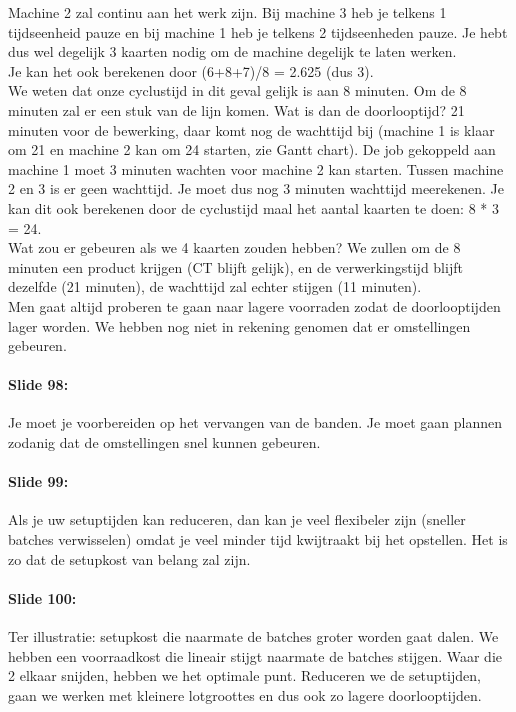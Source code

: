 \documentclass[10pt,a4paper]{report}
\begin{document}
Machine 2 zal continu aan het werk zijn. Bij machine 3 heb je telkens 1 tijdseenheid pauze en bij machine 1 heb je telkens 2 tijdseenheden pauze. Je hebt dus wel degelijk 3 kaarten nodig om de machine degelijk te laten werken.\\
Je kan het ook berekenen door (6+8+7)/8 = 2.625 (dus 3).\\
We weten dat onze cyclustijd in dit geval gelijk is aan 8 minuten. Om de 8 minuten zal er een stuk van de lijn komen. Wat is dan de doorlooptijd? 21 minuten voor de bewerking, daar komt nog de wachttijd bij (machine 1 is klaar om 21 en machine 2 kan om 24 starten, zie Gantt chart). De job gekoppeld aan machine 1 moet 3 minuten wachten voor machine 2 kan starten. Tussen machine 2 en 3 is er geen wachttijd. Je moet dus nog 3 minuten wachttijd meerekenen. Je kan dit ook berekenen door de cyclustijd maal het aantal kaarten te doen: 8 * 3 = 24.\\
Wat zou er gebeuren als we 4 kaarten zouden hebben? We zullen om de 8 minuten een product krijgen (CT blijft gelijk), en de verwerkingstijd blijft dezelfde (21 minuten), de wachttijd zal echter stijgen (11 minuten).\\ 
Men gaat altijd proberen te gaan naar lagere voorraden zodat de doorlooptijden lager worden. 
We hebben nog niet in rekening genomen dat er omstellingen gebeuren.

\paragraph{Slide 98:} Je moet je voorbereiden op het vervangen van de banden. Je moet gaan plannen zodanig dat de omstellingen snel kunnen gebeuren.

\paragraph{Slide 99:} Als je uw setuptijden kan reduceren, dan kan je veel flexibeler zijn (sneller batches verwisselen) omdat je veel minder tijd kwijtraakt bij het opstellen. 
Het is zo dat de setupkost van belang zal zijn. 

\paragraph{Slide 100:} Ter illustratie: setupkost die naarmate de batches groter worden gaat dalen. We hebben een voorraadkost die lineair stijgt naarmate de batches stijgen. Waar die 2 elkaar snijden, hebben we het optimale punt. Reduceren we de setuptijden, gaan we werken met kleinere lotgroottes en dus ook zo lagere doorlooptijden. 
\end{document}
